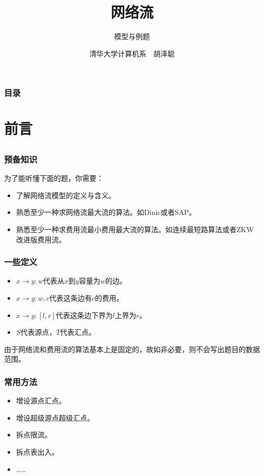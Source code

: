 \documentclass[9pt,dvipsnames,table]{beamer}
\begin{document}
\title[网络流]{\fontsize{24pt}{\baselineskip}网络流}
\subtitle[模型与例题]{\fontsize{16pt}{\baselineskip}模型与例题}
\author{清华大学计算机系~~胡泽聪}
\date{}

\maketitle

\begin{frame}
	\frametitle{目录}
	\tableofcontents[hideallsubsections]
\end{frame}

\section{前言}
\subsection{}
\begin{frame}
	\frametitle{预备知识}
	为了能听懂下面的题，你需要：
	\begin{itemize}
		\item 了解网络流模型的定义与含义。\pause
		\item 熟悉至少一种求网络流最大流的算法。如Dinic或者SAP。\pause
		\item 熟悉至少一种求费用流最小费用最大流的算法。如连续最短路算法或者ZKW改进版费用流。
	\end{itemize}
\end{frame}
\begin{frame}
	\frametitle{一些定义}
	\begin{itemize}
		\item $x\rightarrow y:w$代表从$x$到$y$容量为$w$的边。
		\item $x\rightarrow y:w,c$代表这条边有$c$的费用。
		\item $x\rightarrow y:[l,r]$代表这条边下界为$l$上界为$r$。
		\item $S$代表源点，$T$代表汇点。
	\end{itemize}
	
	由于网络流和费用流的算法基本上是固定的，故如非必要，则不会写出题目的数据范围。
\end{frame}
\begin{frame}
	\frametitle{常用方法}
	\begin{itemize}
		\item 增设源点汇点。
		\item 增设超级源点超级汇点。
		\item 拆点限流。
		\item 拆点表出入。
		\item ……
	\end{itemize}
\end{frame}
\end{document}
